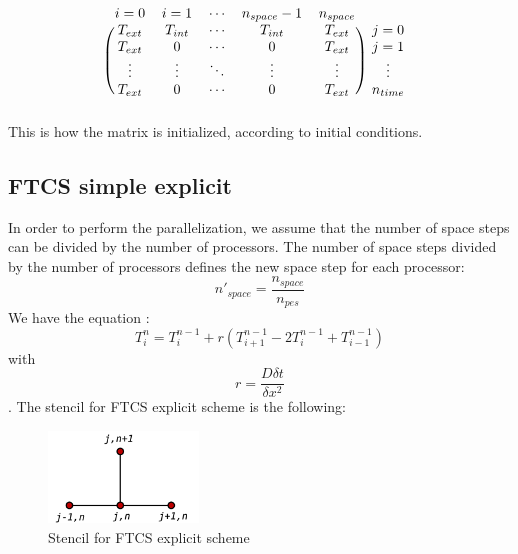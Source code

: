 \documentclass{article}
\begin{document}
            \[
                \begin{blockarray}{cccccc}
                i=0 & i=1 & \cdots & n_{space}-1 & n_{space} \\
                \begin{block}{(ccccc)c}
                  T_{ext} & T_{int} & \cdots & T_{int} & T_{ext} & j=0 \\
                  T_{ext} & 0 & \cdots & 0 & T_{ext} & j=1 \\
                  \vdots & \vdots & \ddots & \vdots & \vdots & \vdots \\
                  T_{ext} & 0 & \cdots & 0 & T_{ext} & n_{time} \\
                \end{block}
                \end{blockarray}
            \]
            This is how the matrix is initialized, according to initial conditions.

            \subsection{FTCS simple explicit}
            
            In order to perform the parallelization, we assume that the number of 
            space steps can be divided by the number of processors. The number of
            space steps divided by the number of processors defines the new space
            step for each processor:
            \begin{equation}
                n'_{space} = \frac{n_{space}}{n_{pes}}
            \end{equation}
            We have the equation :
            \begin{equation}
                T_{i}^{n} = T_{i}^{n-1} + r(T_{i+1}^{n-1} - 2T_{i}^{n-1} + T_{i-1}^{n-1})
            \end{equation}
            with $$r = \frac{D\delta t}{\delta x^{2}}$$.
            The stencil for FTCS explicit scheme is the following:
            \begin{figure}[H]
                \includegraphics[width=4cm]{stencil_explicit.png}
                \centering
                \caption{Stencil for FTCS explicit scheme}
            \end{figure}
\end{document}
